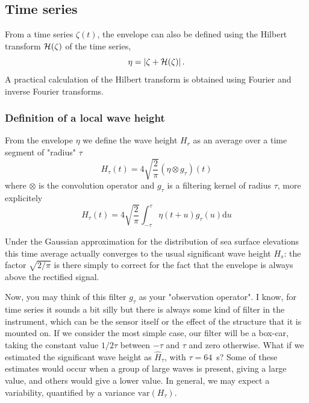 {\subsection{Time series}
From a time series $\zeta(t)$, the envelope can also be defined using the  Hilbert transform $\cal{H}(\zeta)$ of the time series, 
\begin{equation}
   \eta  = \left| \zeta + \cal{H}(\zeta) \right|.
   \label{eq:env_Hilbert}
\end{equation}
A practical calculation of the Hilbert transform is obtained using Fourier and inverse Fourier transforms. 


\subsubsection{Definition of a local wave height}
From the envelope $\eta$ we define the wave height $H_{r}$ as an average over a time segment of "radius" $\tau$
\begin{equation}
    H_{\tau}(t) = 4\sqrt{\frac{2}{\pi}} (\eta \otimes g_{\tau})(t)
   \label{eq:relation_Hs_eta}
\end{equation}
where $\otimes$ is the convolution operator and $g_{\tau}$ is a filtering kernel of radius $\tau$, more explicitely 
\begin{equation}
    H_{\tau}(t) = 4\sqrt{\frac{2}{\pi}} \int_{-\tau}^\tau \eta(t+u)   g_{\tau}(u) {\mathrm d}u
   \label{eq:relation_Hs_eta}
\end{equation}

Under the Gaussian approximation for the distribution of sea surface elevations this time average actually converges to the usual significant wave height $H_s$: the factor $\sqrt{{2}/{\pi}}$ is there simply to correct for the fact that the envelope is always above the rectified signal. 

Now, you may think of this filter $g_\tau$ as your "observation operator". I know, for time series it sounds a bit silly but there is always some kind of filter in the instrument, which can be the sensor itself or the effect of the structure that it is mounted on. If we consider the most simple case, our filter will be a box-car, taking the constant value $1/2\tau$ between $-\tau$ and $\tau$ and zero otherwise. What if we estimated the significant wave height as  $\widehat{H}_\tau$, with $\tau=64$~s? Some of these estimates would occur when a group of large waves is present, giving a large value, and others would give a lower value. In general, we may expect a variability, quantified by a variance $   \mathrm{var}(H_\tau)$. 

}
